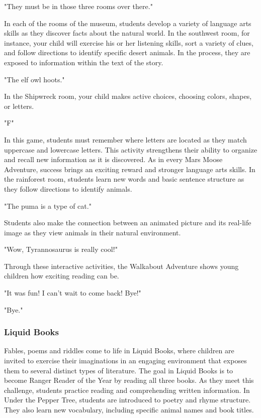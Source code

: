 "They must be in those three rooms over there."

In each of the rooms of the museum, students develop a variety of language arts skills as they discover facts about the natural world.
In the southwest room, for instance, your child will exercise his or her listening skills, sort a variety of clues, and follow directions to identify specific desert animals.
In the process, they are exposed to information within the text of the story.

"The elf owl hoots."

In the Shipwreck room, your child makes active choices, choosing colors, shapes, or letters.

"F"

In this game, students must remember where letters are located as they match uppercase and lowercase letters.
This activity strengthens their ability to organize and recall new information as it is discovered.
As in every Mars Moose Adventure, success brings an exciting reward and stronger language arts skills.
In the rainforest room, students learn new words and basic sentence structure as they follow directions to identify animals.

"The puma is a type of cat."

Students also make the connection between an animated picture and its real-life image as they view animals in their natural environment.

"Wow, Tyrannosaurus is really cool!"

Through these interactive activities, the Walkabout Adventure shows young children how exciting reading can be.

"It was fun! I can't wait to come back! Bye!"

"Bye."

\subsubsection{Liquid Books}

Fables, poems and riddles come to life in Liquid Books, where children are invited to exercise their imaginations in an engaging environment that exposes them to several distinct types of literature.
The goal in Liquid Books is to become Ranger Reader of the Year by reading all three books.
As they meet this challenge, students practice reading and comprehending written information.
In Under the Pepper Tree, students are introduced to poetry and rhyme structure.
They also learn new vocabulary, including specific animal names and book titles.

